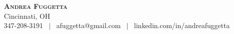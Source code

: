 \documentclass[letterpaper,12pt]{fed-res} %
\begin{document}
\begin{center}
    \textbf{\Huge \scshape Andrea Fuggetta} \\ \vspace{1pt}
    Cincinnati, OH \\ \vspace{1pt}
    347-208-3191 \ $|$ \ afuggetta@gmail.com \ $|$ \ linkedin.com/in/andreafuggetta \\ \vspace{1pt} %
\end{center}










\end{document}
